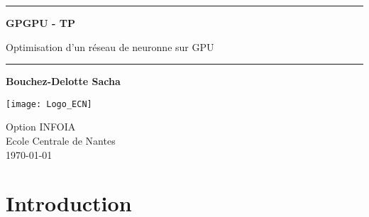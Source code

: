 \documentclass[12pt, a4paper]{article}
\begin{document}
\begin{titlepage}
   \begin{center}
       
       
       \begin{center}
      \rule{0.75\linewidth}{1pt}
      \end{center}
      \vspace*{1cm}
       \textbf{\LARGE GPGPU - TP}

       \vspace{0.5cm}
        \Large Optimisation d'un réseau de neuronne sur GPU \normalsize
        
       \begin{center}
      \rule{0.5\linewidth}{1pt}
      \end{center}
  
            
       \vspace{1.5cm}

       \textbf{Bouchez-Delotte Sacha}


            
       \vspace{9cm}
     
       \texttt{[image: Logo\_ECN]}
            
       Option INFOIA\\
       Ecole Centrale de Nantes\\
       \today
            
   \end{center}
\end{titlepage}


\tableofcontents

\section{Introduction}
\end{document}
